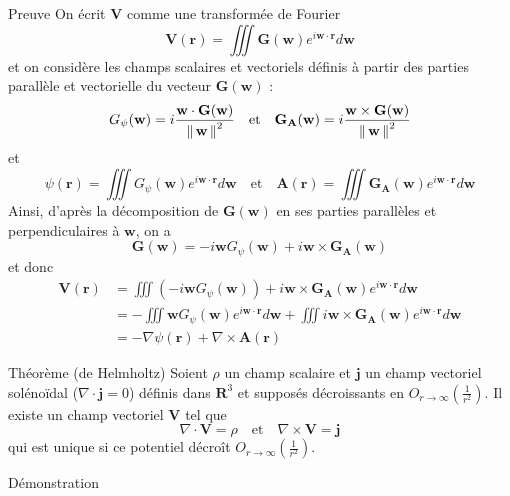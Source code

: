 \begin{demo}{Preuve}
            On écrit $\mathbf{V}$ comme une transformée de Fourier
            \[ \mathbf{V}(\mathbf{r}) = \iiint \mathbf{G}(\mathbf{w}) e^{i \mathbf{w} \cdot \mathbf{r}} d\mathbf{w} \]
            et on considère les champs scalaires et vectoriels définis à partir des parties parallèle et vectorielle du vecteur $\mathbf{G}(\mathbf{w})$ :
            \[ G_{\psi}(\mathbf{w}) = i \frac{\mathbf{w} \cdot \mathbf{G}(\mathbf{w})}{\left\lVert \, \mathbf{w} \, \right\rVert^2} \quad \text{et} \quad \mathbf{G}_{\mathbf{A}}(\mathbf{w}) = i \frac{\mathbf{w} \times \mathbf{G}(\mathbf{w})}{\left\lVert \, \mathbf{w} \, \right\rVert^2} \]
            et 
            \[ \psi(\mathbf{r}) = \iiint G_{\psi}(\mathbf{w}) e^{i \mathbf{w} \cdot \mathbf{r}} d \mathbf{w} \quad \text{et} \quad \mathbf{A}(\mathbf{r}) = \iiint \mathbf{G}_{\mathbf{A}}(\mathbf{w}) e^{i \mathbf{w} \cdot \mathbf{r}} d \mathbf{w} \]
            Ainsi, d’après la décomposition de $\mathbf{G}(\mathbf{w})$ en ses parties parallèles et perpendiculaires à $\mathbf{w}$, on a 
            \[ \mathbf{G}(\mathbf{w}) = - i \mathbf{w} G_{\psi}(\mathbf{w}) + i \mathbf{w} \times \mathbf{G}_{\mathbf{A}}(\mathbf{w}) \]   
            et donc
            \begin{align*}
                \mathbf{V}(\mathbf{r})
                &= \iiint (-i \mathbf{w} G_{\psi}(\mathbf{w})) + i \mathbf{w} \times \mathbf{G}_{\mathbf{A}}(\mathbf{w}) e^{i \mathbf{w} \cdot \mathbf{r}} d \mathbf{w}  \\
                &= - \iiint \mathbf{w} G_{\psi}(\mathbf{w}) e^{i \mathbf{w} \cdot \mathbf{r}} d \mathbf{w} + \iiint i \mathbf{w} \times \mathbf{G}_{\mathbf{A}}(\mathbf{w}) e^{i \mathbf{w} \cdot \mathbf{r}} d \mathbf{w} \\
                &= - \nabla \psi(\mathbf{r}) + \nabla \times \mathbf{A}(\mathbf{r})
            \end{align*}
        \end{demo}

        \begin{omed}{Théorème (de Helmholtz)}
            Soient $\rho$ un champ scalaire et $\mathbf{j}$ un champ vectoriel solénoïdal ($\nabla \cdot \mathbf{j} = 0$) définis dans $\mathbf{R}^3$ et supposés décroissants en $O_{r \to \infty} \left(\frac{1}{r^2}\right)$. Il existe un champ vectoriel $\mathbf{V}$ tel que 
            \[ \nabla \cdot \mathbf{V} = \rho \quad \text{et} \quad \nabla \times \mathbf{V} = \mathbf{j} \]   
            qui est unique si ce potentiel décroît $O_{r \to \infty} \left(\frac{1}{r^2}\right)$.
        \end{omed}

        \begin{demo}{Démonstration}
            
        \end{demo}